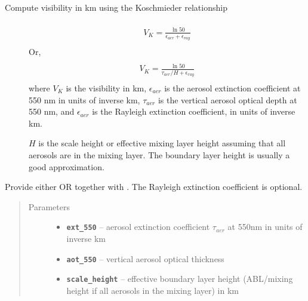 \documentclass[a4paper,10pt,english]{sphinxmanual}
\begin{document}
\begin{fulllineitems}
\label{packages:librad.koschmieder_vis}~\begin{description}
\item[{Compute visibility in km using the Koschmieder relationship}] \leavevmode\begin{align*}\begin{aligned}
\begin{split}V_K = \frac{\ln 50}{\epsilon_{aer} + \epsilon_{ray}}\end{split}\end{aligned}\end{align*}
Or,
\begin{align*}\begin{aligned}
\begin{split}V_K = \frac{\ln 50}{\tau_{aer}/ H + \epsilon_{ray}}\end{split}\end{aligned}\end{align*}
where \(V_K\) is the visibility in km, \(\epsilon_{aer}\) is the aerosol extinction coefficient at
550 nm in units of inverse km, \(\tau_{aer}\) is the vertical aerosol optical depth at 550 nm,
and \(\epsilon_{aer}\) is the Rayleigh extinction coefficient, in units of inverse km.

\(H\) is the scale height or effective mixing layer height assuming that all aerosols are in the mixing
layer. The boundary layer height is usually a good approximation.

\end{description}

Provide either  OR  together with .
The Rayleigh extinction coefficient is optional.
\begin{quote}\begin{description}
\item[{Parameters}] \leavevmode\begin{itemize}
\item {} 
\textbf{\texttt{ext\_550}} -- aerosol extinction coefficient \(\tau_{aer}\) at 550nm in units of inverse km

\item {} 
\textbf{\texttt{aot\_550}} -- vertical aerosol optical thickness

\item {} 
\textbf{\texttt{scale\_height}} -- effective boundary layer height (ABL/mixing height if all aerosols in the mixing layer) in km


\end{itemize}
\end{description}
\end{quote}
\end{fulllineitems}
\end{document}
